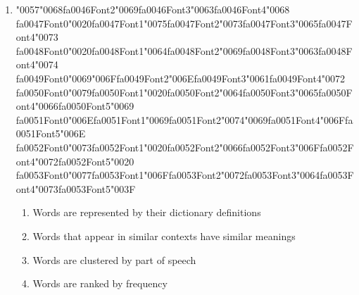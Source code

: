 \documentclass[12pt]{article}
\begin{document}
\begin{enumerate}[label=Q\arabic*.]
\item {\char"0057}{\char"0068}{\csname fa0046Font2\endcsname\char"0069}{\csname fa0046Font3\endcsname\char"0063}{\csname fa0046Font4\endcsname\char"0068} {\csname fa0047Font0\endcsname\char"0020}{\csname fa0047Font1\endcsname\char"0075}{\csname fa0047Font2\endcsname\char"0073}{\csname fa0047Font3\endcsname\char"0065}{\csname fa0047Font4\endcsname\char"0073} {\csname fa0048Font0\endcsname\char"0020}{\csname fa0048Font1\endcsname\char"0064}{\csname fa0048Font2\endcsname\char"0069}{\csname fa0048Font3\endcsname\char"0063}{\csname fa0048Font4\endcsname\char"0074} {\csname fa0049Font0\endcsname\char"0069}{\char"006F}{\csname fa0049Font2\endcsname\char"006E}{\csname fa0049Font3\endcsname\char"0061}{\csname fa0049Font4\endcsname\char"0072} {\csname fa0050Font0\endcsname\char"0079}{\csname fa0050Font1\endcsname\char"0020}{\csname fa0050Font2\endcsname\char"0064}{\csname fa0050Font3\endcsname\char"0065}{\csname fa0050Font4\endcsname\char"0066}{\csname fa0050Font5\endcsname\char"0069} {\csname fa0051Font0\endcsname\char"006E}{\csname fa0051Font1\endcsname\char"0069}{\csname fa0051Font2\endcsname\char"0074}{\char"0069}{\csname fa0051Font4\endcsname\char"006F}{\csname fa0051Font5\endcsname\char"006E} {\csname fa0052Font0\endcsname\char"0073}{\csname fa0052Font1\endcsname\char"0020}{\csname fa0052Font2\endcsname\char"0066}{\csname fa0052Font3\endcsname\char"006F}{\csname fa0052Font4\endcsname\char"0072}{\csname fa0052Font5\endcsname\char"0020} {\csname fa0053Font0\endcsname\char"0077}{\csname fa0053Font1\endcsname\char"006F}{\csname fa0053Font2\endcsname\char"0072}{\csname fa0053Font3\endcsname\char"0064}{\csname fa0053Font4\endcsname\char"0073}{\csname fa0053Font5\endcsname\char"003F}
\begin{enumerate}[label=(\Alph*)]
    \item Words are represented by their dictionary definitions
    \item Words that appear in similar contexts have similar meanings
    \item Words are clustered by part of speech
    \item Words are ranked by frequency
\end{enumerate}

\end{enumerate}
\end{document}
